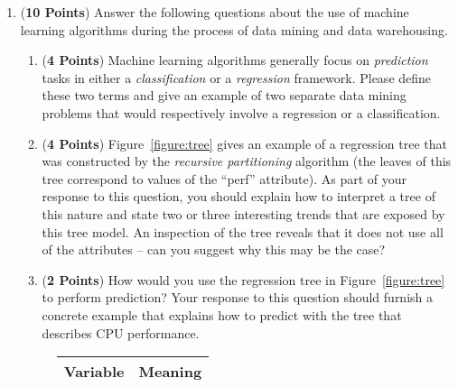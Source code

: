 \documentclass[12pt]{article}
\begin{document}
\begin{enumerate}
\begin{enumerate}

\end{enumerate}

\newpage

\item ({\bf 10 Points}) Answer the following questions about the use
  of machine learning algorithms during the process of data mining and
  data warehousing.

  \begin{enumerate}

  \item ({\bf 4 Points}) Machine learning algorithms generally focus
    on {\em prediction} tasks in either a {\em classification} or a
    {\em regression} framework.  Please define these two terms and
    give an example of two separate data mining problems that would
    respectively involve a regression or a classification.

  \item ({\bf 4 Points}) Figure~\ref{figure:tree} gives an example of
    a regression tree that was constructed by the {\em recursive
      partitioning} algorithm (the leaves of this tree correspond to
    values of the ``perf'' attribute).  As part of your response to
    this question, you should explain how to interpret a tree of this
    nature and state two or three interesting trends that are exposed
    by this tree model.  An inspection of the tree reveals that it
    does not use all of the attributes -- can you suggest why this may
    be the case?

  \item ({\bf 2 Points}) How would you use the regression tree in
    Figure~\ref{figure:tree} to perform prediction?  Your response to
    this question should furnish a concrete example that explains how
    to predict with the tree that describes CPU performance.

\end{enumerate}

\begin{figure}[h]

  \centering

  \begin{tabular}{c | c}

    {\bf Variable} & {\bf Meaning} \\ \hline


\end{tabular}
\end{figure}
\end{enumerate}
\end{document}

